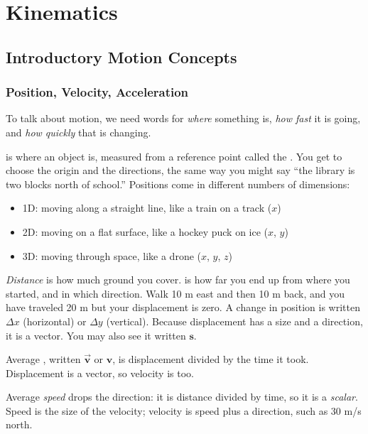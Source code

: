 \chapter{Kinematics}


\section{Introductory Motion Concepts}
\subsection{Position, Velocity, Acceleration}

To talk about motion, we need words for \emph{where} something is, \emph{how fast} it is going, and \emph{how quickly} that is changing.

 is where an object is, measured from a reference point called the . You get to choose the origin and the directions, the same way you might say ``the library is two blocks north of school.'' Positions come in different numbers of dimensions:

\begin{itemize}
    \item 1D: moving along a straight line, like a train on a track ($x$)
    \item 2D: moving on a flat surface, like a hockey puck on ice ($x$, $y$)
    \item 3D: moving through space, like a drone ($x$, $y$, $z$)
\end{itemize}

\emph{Distance} is how much ground you cover.  is how far you end up from where you started, and in which direction. Walk 10 m east and then 10 m back, and you have traveled 20 m but your displacement is zero. A change in position is written $\Delta x$ (horizontal) or $\Delta y$ (vertical). Because displacement has a size and a direction, it is a vector. You may also see it written $\mathbf s$.


Average , written $\vec{\mathbf{v}}$ or $\mathbf{v}$, is displacement divided by the time it took. Displacement is a vector, so velocity is too.

Average \emph{speed} drops the direction: it is distance divided by time, so it is a \emph{scalar}. Speed is the size of the velocity; velocity is speed plus a direction, such as 30 m/s north.

